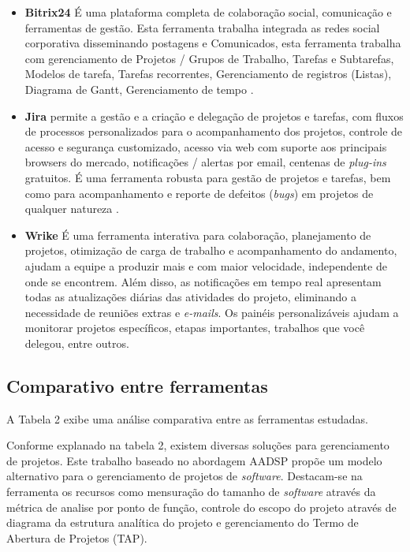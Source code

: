 \documentclass{acm_proc_article-sp}
\begin{document}
\begin{itemize}
\item \textbf{Bitrix24} É uma plataforma completa de colaboração social, comunicação e ferramentas de gestão. Esta ferramenta trabalha integrada as redes social corporativa disseminando postagens e Comunicados, esta ferramenta trabalha com gerenciamento de Projetos / Grupos de Trabalho, Tarefas e Subtarefas, Modelos de tarefa, Tarefas recorrentes, Gerenciamento de registros (Listas), Diagrama de Gantt, Gerenciamento de tempo \cite{bitrix24:ferramenta}.
\item \textbf{Jira}  permite a gestão e a criação e delegação de projetos e tarefas, com fluxos de processos personalizados para o acompanhamento dos projetos, controle de acesso e segurança customizado, acesso via web com suporte aos principais browsers do mercado, notificações / alertas por email,  centenas de \textit{plug-ins} gratuitos. É uma ferramenta robusta para gestão de projetos e tarefas, bem como para acompanhamento e reporte de defeitos (\textit{bugs}) em projetos de qualquer natureza \cite{jira:ferramenta}.
\item \textbf{Wrike} É uma ferramenta interativa para colaboração, planejamento de projetos, otimização de carga de trabalho e acompanhamento do andamento, ajudam a equipe a produzir mais e com maior velocidade, independente de onde se encontrem. Além disso, as notificações em tempo real apresentam todas as atualizações diárias das atividades do projeto, eliminando a necessidade de reuniões extras e \textit{e-mails}. Os painéis personalizáveis ajudam a monitorar projetos específicos, etapas importantes, trabalhos que você delegou, entre outros.  
\end{itemize}

\subsection{Comparativo entre ferramentas}
 A Tabela 2 exibe uma análise comparativa entre as ferramentas estudadas.

Conforme explanado na tabela 2, existem diversas soluções para gerenciamento de projetos. Este trabalho baseado no abordagem AADSP propõe um modelo alternativo para o gerenciamento de projetos de \textit{software}. Destacam-se na ferramenta os recursos como mensuração do tamanho de \textit{software} através da métrica de analise por ponto de função, controle do escopo do projeto através de diagrama da estrutura analítica do projeto e gerenciamento do Termo de Abertura de Projetos (TAP). 
\end{document}
